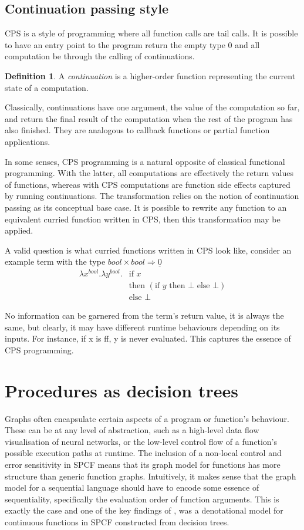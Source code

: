 \documentclass[12pt,a4paper]{report}
\theoremstyle{definition}
\newtheorem{definition}{Definition}[chapter]%
\theoremstyle{remark}
\begin{document}
\subsection{Continuation passing style}
CPS is a style of programming where all function calls are tail calls. It is possible to have an entry point to the program return the empty type $0$ and all computation be through the calling of continuations.

\begin{definition}
    A \emph{continuation} is a higher-order function representing the current state of a computation.
    
    Classically, continuations have one argument, the value of the computation so far, and return the final result of the computation when the rest of the program has also finished. They are analogous to callback functions or partial function applications. 
\end{definition}

In some senses, CPS programming is a natural opposite of classical functional programming. With the latter, all computations are effectively the return values of functions, whereas with CPS computations are function side effects captured by running continuations. The transformation relies on the notion of continuation passing as its conceptual base case. It is possible to rewrite any function to an equivalent curried function written in CPS, then this transformation may be applied.

A valid question is what curried functions written in CPS look like, consider an example term with the type $bool \times bool \Rightarrow \underline{0}$
\[
\begin{split}
\lambda x^{bool}. \lambda y^{bool}. &\text{if } x  \\
&\text{then }( \text{if } y \text{ then } \bot \text{ else } \bot )\\
&\text{else } \bot
\end{split}
\]

No information can be garnered from the term's return value, it is always the same, but clearly, it may have different runtime behaviours depending on its inputs. For instance, if x is ff, y is never evaluated. This captures the essence of CPS programming.

\section{Procedures as decision trees}
Graphs often encapsulate certain aspects of a program or function's behaviour. These can be at any level of abstraction, such as a high-level data flow visualisation of neural networks, or the low-level control flow of a function's possible execution paths at runtime. The inclusion of a non-local control and error sensitivity in SPCF means that its graph model for functions has more structure than generic function graphs. Intuitively, it makes sense that the graph model for a sequential language should have to encode some essence of sequentiality, specifically the evaluation order of function arguments. This is exactly the case and one of the key findings of \cite{cartwright_1992}, was a denotational model for continuous functions in SPCF constructed from decision trees. 
\end{document}
